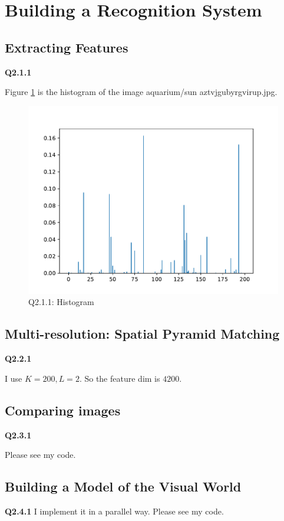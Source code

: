 \documentclass[
  course = {{16-720B Computer Vision}},
  quartile = {{1}},
  assignment = 2-Bag\ of \ Visual\ Words,
  name = {{Kangle Deng}},
  email = {{kangled@andrew.cmu.edu}},
  firstexercise = 1
]{aga-homework}
\begin{document}
\section{Building a Recognition System}
\subsection{Extracting Features}
\noindent\textbf{Q2.1.1}

Figure \ref{fig:hw2_q211} is the histogram of the image aquarium/sun aztvjgubyrgvirup.jpg.

\begin{figure}
    \centering
    \includegraphics{CV/fig/hw2/Q211.pdf}
    \caption{Q2.1.1: Histogram}
    \label{fig:hw2_q211}
\end{figure}

\subsection{Multi-resolution: Spatial Pyramid Matching}
\noindent\textbf{Q2.2.1}

I use $K = 200, L = 2$. So the feature dim is $4200$.

\subsection{Comparing images}
\noindent\textbf{Q2.3.1}

Please see my code.

\subsection{Building a Model of the Visual World}
\noindent\textbf{Q2.4.1}
I implement it in a parallel way. Please see my code.
\end{document}
